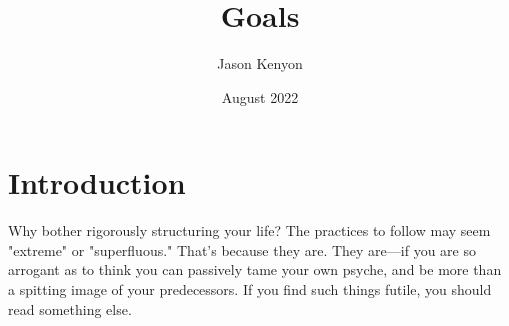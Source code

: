 \documentclass{book}
\title{Goals}
\author{Jason Kenyon}
\date{August 2022}
\numberwithin{equation}{section}
\begin{document}
\maketitle
\tableofcontents

\chapter{Introduction}
Why bother rigorously structuring your life? The practices to follow may seem "extreme" or "superfluous." That's because they are. They are---if you are so arrogant as to think you can passively tame your own psyche, and be more than a spitting image of your predecessors. If you find such things futile, you should read something else. 
\end{document}

